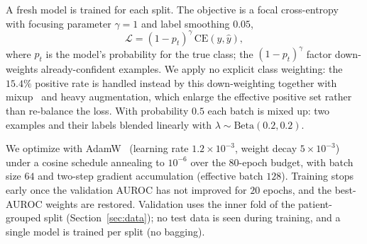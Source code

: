 \documentclass[sigconf,nonacm]{acmart}
\begin{document}
A fresh model is trained for each split. The objective is a focal
cross-entropy~\cite{lin_focal_2017} with focusing parameter $\gamma=1$ and label smoothing $0.05$,
\begin{equation}
\mathcal{L} = (1 - p_t)^{\gamma}\,\mathrm{CE}(y,\hat{y}),
\label{eq:focal}
\end{equation}
where $p_t$ is the model's probability for the true class; the
$(1-p_t)^{\gamma}$ factor down-weights already-confident examples. We apply
no explicit class weighting: the $15.4\%$ positive rate is handled instead by
this down-weighting together with mixup~\cite{zhang_mixup_2018} and heavy augmentation, which enlarge
the effective positive set rather than re-balance the loss. With probability
$0.5$ each batch is mixed up: two examples and their labels blended
linearly with $\lambda \sim \mathrm{Beta}(0.2, 0.2)$.

We optimize with AdamW~\cite{loshchilov_decoupled_2019} (learning rate $1.2\times10^{-3}$, weight decay
$5\times10^{-3}$) under a cosine schedule annealing to $10^{-6}$ over the
$80$-epoch budget, with batch size $64$ and two-step gradient accumulation
(effective batch $128$). Training stops early once the validation AUROC has
not improved for $20$ epochs, and the best-AUROC weights are restored.
Validation uses the inner fold of the patient-grouped split
(Section~\ref{sec:data}); no test data is seen during training, and a single
model is trained per split (no bagging).
\end{document}
